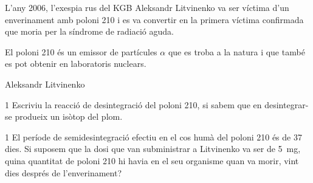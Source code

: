 L'any 2006, l'exespia rus del KGB Aleksandr Litvinenko va ser víctima d'un enverinament amb poloni 210 i es va convertir en la primera víctima confirmada que moria per la síndrome de radiació aguda.

El poloni 210 és un emissor de partícules $\alpha$ que es troba a la natura i que també es pot obtenir en laboratoris nuclears.

{\centering Aleksandr Litvinenko\par}

\begin{apartat}{1}
Escriviu la reacció de desintegració del poloni 210, si sabem que en desintegrar-se produeix un isòtop del plom.
\end{apartat}

\begin{apartat}{1}
El període de semidesintegració efectiu en el cos humà del poloni 210 és de 37 dies. Si suposem que la dosi que van subministrar a Litvinenko va ser de 5~mg, quina quantitat de poloni 210 hi havia en el seu organisme quan va morir, vint dies després de l'enverinament?
\end{apartat}

